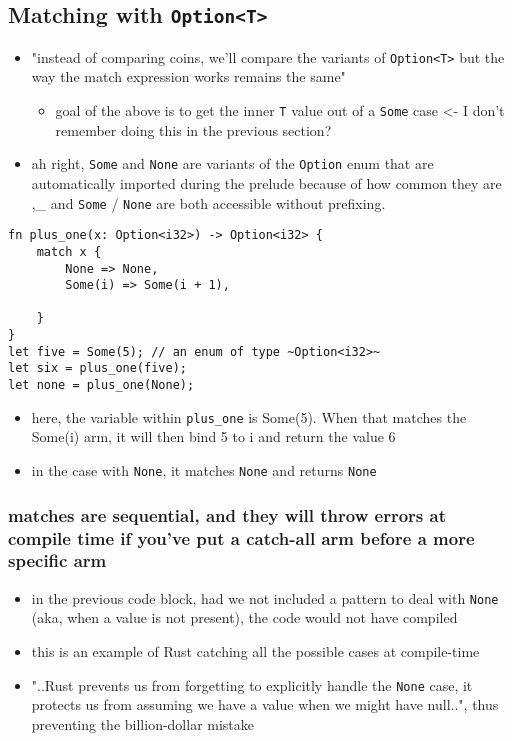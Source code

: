 \documentclass[11pt]{article}
\begin{document}
\subsection{Matching with \texttt{Option<T>}}
\label{sec:orgc43e788}
\begin{itemize}
\item "instead of comparing coins, we'll compare the variants of \texttt{Option<T>} but the way the match expression works remains the same"
\begin{itemize}
\item goal of the above is to get the inner \texttt{T} value out of a \texttt{Some} case <- I don't remember doing this in the previous section?
\end{itemize}
\item ah right, \texttt{Some} and \texttt{None} are variants of the \texttt{Option} enum that are automatically imported during the prelude because of how common they are ,\_ and \texttt{Some} / \texttt{None} are both accessible without prefixing.
\end{itemize}
\begin{verbatim}
fn plus_one(x: Option<i32>) -> Option<i32> {
    match x {
        None => None,
        Some(i) => Some(i + 1),

    }
}
let five = Some(5); // an enum of type ~Option<i32>~
let six = plus_one(five);
let none = plus_one(None);
\end{verbatim}
\begin{itemize}
\item here, the variable within \texttt{plus\_one} is Some(5). When that matches the Some(i) arm, it will then bind 5 to i and return the value 6
\item in the case with \texttt{None}, it matches \texttt{None} and returns \texttt{None}
\end{itemize}
\subsubsection{matches are sequential, and they will throw errors at compile time if you've put a catch-all arm before a more specific arm}
\label{sec:org7d0fc47}

\begin{itemize}
\item in the previous code block, had we not included a pattern to deal with \texttt{None} (aka, when a value is not present), the code would not have compiled
\item this is an example of Rust catching all the possible cases at compile-time
\item "..Rust prevents us from forgetting to explicitly handle the \texttt{None} case, it protects us from assuming we have a value when we might have null..", thus preventing the billion-dollar mistake
\end{itemize}
\end{document}

